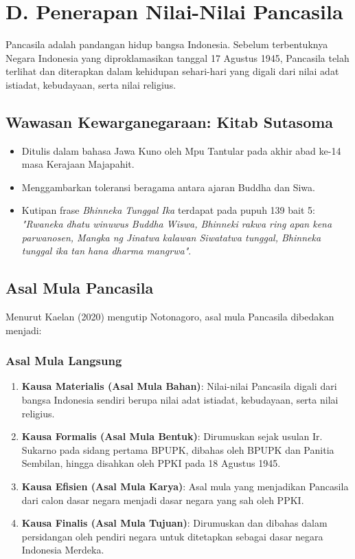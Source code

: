 \section{D. Penerapan Nilai-Nilai Pancasila}

Pancasila adalah pandangan hidup bangsa Indonesia. Sebelum terbentuknya Negara Indonesia yang diproklamasikan tanggal 17 Agustus 1945, Pancasila telah terlihat dan diterapkan dalam kehidupan sehari-hari yang digali dari nilai adat istiadat, kebudayaan, serta nilai religius.

\subsection{Wawasan Kewarganegaraan: Kitab Sutasoma}
\begin{itemize}
    \item Ditulis dalam bahasa Jawa Kuno oleh Mpu Tantular pada akhir abad ke-14 masa Kerajaan Majapahit.
    \item Menggambarkan toleransi beragama antara ajaran Buddha dan Siwa.
    \item Kutipan frase \textit{Bhinneka Tunggal Ika} terdapat pada pupuh 139 bait 5: \textit{"Rwaneka dhatu winuwus Buddha Wiswa, Bhinneki rakwa ring apan kena parwanosen, Mangka ng Jinatwa kalawan Siwatatwa tunggal, Bhinneka tunggal ika tan hana dharma mangrwa"}.
\end{itemize}

\subsection{Asal Mula Pancasila}
Menurut Kaelan (2020) mengutip Notonagoro, asal mula Pancasila dibedakan menjadi:

\subsubsection{Asal Mula Langsung}
\begin{enumerate}
    \item \textbf{Kausa Materialis (Asal Mula Bahan)}: Nilai-nilai Pancasila digali dari bangsa Indonesia sendiri berupa nilai adat istiadat, kebudayaan, serta nilai religius.
    \item \textbf{Kausa Formalis (Asal Mula Bentuk)}: Dirumuskan sejak usulan Ir. Sukarno pada sidang pertama BPUPK, dibahas oleh BPUPK dan Panitia Sembilan, hingga disahkan oleh PPKI pada 18 Agustus 1945.
    \item \textbf{Kausa Efisien (Asal Mula Karya)}: Asal mula yang menjadikan Pancasila dari calon dasar negara menjadi dasar negara yang sah oleh PPKI.
    \item \textbf{Kausa Finalis (Asal Mula Tujuan)}: Dirumuskan dan dibahas dalam persidangan oleh pendiri negara untuk ditetapkan sebagai dasar negara Indonesia Merdeka.
\end{enumerate}

